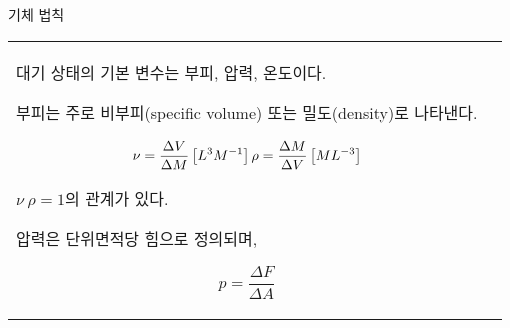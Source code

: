 \begin{frame}[t]{기체 법칙}
	\begin{tabular}{ll}
		\begin{minipage}[t]{0.475\textwidth} \scriptsize 
			대기 상태의 기본 변수는 부피, 압력, 온도이다.

			부피는 주로 비부피(specific volume) 또는 밀도(density)로 나타낸다.

				$$	{\displaystyle	{
						\nu=\frac{\Delta V}{\Delta M}\left[L^3 M^{-1}\right] \\
						\rho=\frac{\Delta M}{\Delta V}\left[M L^{-3}\right]			
				}	}$$
				
			$\nu ~ \rho = 1$의 관계가 있다. 
			
			압력은 단위면적당 힘으로 정의되며, 

				$$	{\displaystyle	{
					p = \frac{\Delta F}{\Delta A}
				}	}$$
		\end{minipage}
		&
		\begin{minipage}[t]{0.475\textwidth} \scriptsize 
		
	
		\end{minipage}
	\end{tabular}
\end{frame}




